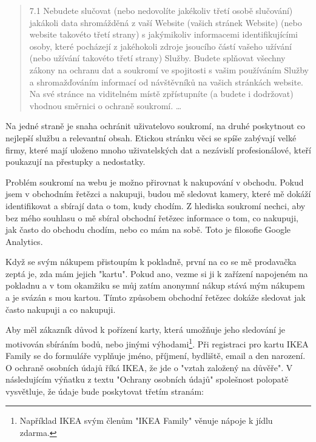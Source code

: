 \documentclass[bc,male,java,dept456]{diploma}						%
\begin{document}
\begin{quote}
7.1 Nebudete slučovat (nebo nedovolíte jakékoliv třetí osobě slučování) jakákoli data shromážděná z vaší Website (vašich stránek Website) (nebo website ta\-ko\-vé\-to třetí strany) s jakýmikoliv informacemi identifikujícími osoby, které pocházejí z jakéhokoli zdroje jsoucího částí vašeho užívání (nebo užívání takovéto třetí strany) Služby. Budete splňovat všechny zákony na ochranu dat a soukromí ve spojitosti s vašim používáním Služby a shromažďováním informací od návštěvníků na vašich stránkách website. Na své stránce na viditelném místě zpřístupníte (a budete i dodržovat) vhodnou směrnici o ochraně soukromí.
\ldots
\end{quote}

Na jedné straně je snaha ochránit uživatelovo soukromí, na druhé poskytnout co nejlepší službu a relevantní obsah. Etickou stránku věci se spíše zabývají velké firmy, které mají uloženo mnoho uživatelských dat a nezávislí profesionálové, kteří poukazují na přestupky a nedostatky.

Problém soukromí na webu je možno přirovnat k nakupování v obchodu. Pokud jsem v obchodním řetězci a nakupuji, budou mě sledovat kamery, které mě dokáží identifikovat a sbírají data o tom, kudy chodím. Z hlediska soukromí nechci, aby bez mého souhlasu o mě sbíral obchodní řetězec informace o tom, co nakupuji, jak často do obchodu chodím, nebo co mám na sobě. Toto je filosofie Google Analytics.

Když se svým nákupem přistoupím k pokladně, první na co se mě prodavačka zeptá je, zda mám jejich "kartu". Pokud ano, vezme si ji k zařízení napojeném na pokladnu a v tom okamžiku se můj zatím anonymní nákup stává mým nákupem a je svázán s mou kartou. Tímto způsobem obchodní řetězec dokáže sledovat jak často nakupuji a co nakupuji.

Aby měl zákazník důvod k pořízení karty, která umožňuje jeho sledování je motivován sbíráním bodů, nebo jinými výhodami\footnote{Například IKEA svým členům "IKEA Family" věnuje nápoje k jídlu zdarma.}. Při registraci pro kartu IKEA Family se do formuláře vyplňuje jméno, příjmení, bydliště, email a den narození. O ochraně osobních údajů říká IKEA, že jde o "vztah založený na důvěře". V následujícím výňatku z textu "Ochrany osobních údajů" spolešnost polopatě vysvětluje, že údaje bude poskytovat třetím stranám:
\end{document}
